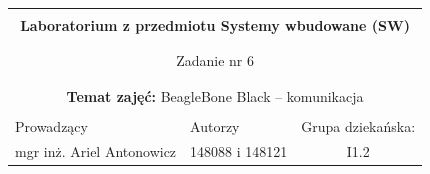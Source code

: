 \documentclass[polish,a4paper]{article}
\begin{document}
	\begin{center}
		\begin{tabular}{ p{} p{} p{} p{} p{} }
			
			&   &   &   &  \\
			\hline
			\multicolumn{5}{|c|}{}\\[-1ex]
			\multicolumn{5}{|c|}{{\LARGE \textbf{Laboratorium z przedmiotu Systemy wbudowane (SW)}}}\\
			\multicolumn{5}{|c|}{}\\[-1ex]
			\hline
			\hline
			
			\multicolumn{5}{|c|}{}\\[-1ex]
			\multicolumn{5}{|c|}{{\LARGE Zadanie nr 6}}\\
			\multicolumn{5}{|c|}{}\\[-1ex]
			\hline
			\hline
			
			\multicolumn{5}{|c|}{}\\[-1ex]
			\multicolumn{5}{|c|}{{\textbf{Temat zajęć:} BeagleBone Black – komunikacja}}\\
			\multicolumn{5}{|c|}{}\\[-1ex]
			\hline
			\hline
			
			\multicolumn{1}{|l|}{Prowadzący} &
			\multicolumn{2}{|l|}{Autorzy} &
			\multicolumn{2}{|l|}{Grupa dziekańska:} \\
			\multicolumn{1}{|c|}{mgr inż. Ariel Antonowicz} &
			\multicolumn{2}{|c|}{148088 i 148121} &
			\multicolumn{2}{|c|}{I1.2} \\
			\hline
			\hline
		\end{tabular}
	\end{center}
	\[\]
\end{document}
